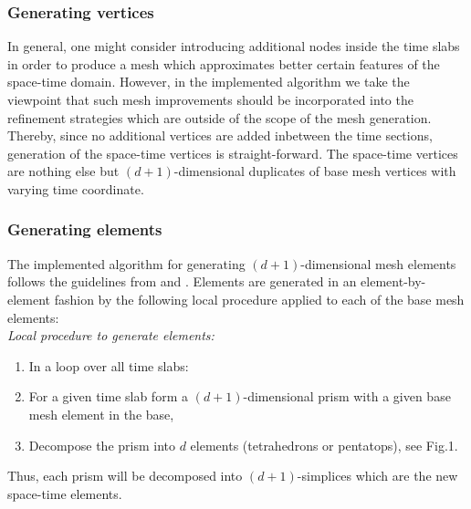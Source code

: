 \documentclass[12pt]{article}
\begin{document}
\subsubsection{Generating vertices}
In general, one might consider introducing additional nodes inside the time slabs \cite{Behr} in order to produce a mesh which approximates better certain features of the space-time domain. However, in the implemented algorithm we take the viewpoint that such mesh improvements should be incorporated into the refinement strategies which are outside of the scope of the mesh generation. 
Thereby, since no additional vertices are added inbetween the time sections, generation of the space-time vertices is straight-forward. The  space-time vertices are nothing else but $(d+1)$-dimensional duplicates of base mesh vertices with varying time coordinate.

\subsubsection{Generating elements}
The implemented algorithm for generating $(d+1)$-dimensional mesh elements follows the guidelines from \cite{Behr} and \cite{NeumuellerMeshgen}. Elements are generated in an element-by-element fashion by the following local procedure applied to each of the base mesh elements: \\
\textit{Local procedure to generate elements:}
\begin{enumerate}
	\item[] In a loop over all time slabs:
	\item For a given time slab form a $(d+1)$-dimensional prism with a given base mesh element in the base,
	\item Decompose the prism into $d$ elements (tetrahedrons or pentatops), see Fig.1.
\end{enumerate}
Thus, each  prism will be decomposed into $(d+1)$-simplices which are the new space-time elements.
\end{document}
